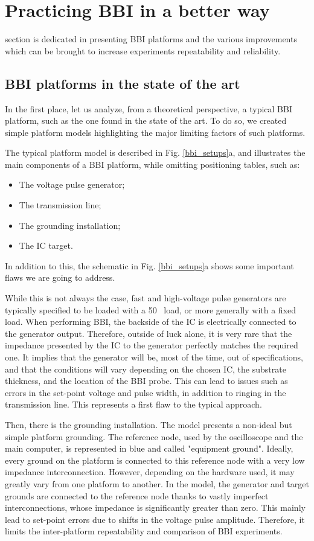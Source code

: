 
\section{Practicing BBI in a better way}
	 section is dedicated in presenting BBI platforms and the various improvements which can be brought to increase experiments repeatability and reliability.
	\subsection{BBI platforms in the state of the art}
		In the first place, let us analyze, from a theoretical perspective, a typical BBI platform, such as the one found in the state of the art.
		To do so, we created simple platform models highlighting the major limiting factors of such platforms.
		
		The typical platform model is described in Fig. \ref{bbi_setups}a, and illustrates the main components of a BBI platform, while omitting positioning tables, such as:
		\begin{itemize}
			\item The voltage pulse generator;
			\item The transmission line;
			\item The grounding installation;
			\item The IC target.
		\end{itemize}
		In addition to this, the schematic in Fig. \ref{bbi_setups}a shows some important flaws we are going to address.

		While this is not always the case, fast and high-voltage pulse generators are typically specified to be loaded with a 50 \textOmega\ load, or more generally with a fixed load.
		When performing BBI, the backside of the IC is electrically connected to the generator output.
		Therefore, outside of luck alone, it is very rare that the impedance presented by the IC to the generator perfectly matches the required one.
		It implies that the generator will be, most of the time, out of specifications, and that the conditions will vary depending on the chosen IC, the substrate thickness, and the location of the BBI probe.
		This can lead to issues such as errors in the set-point voltage and pulse width, in addition to ringing in the transmission line.
		This represents a first flaw to the typical approach.

		Then, there is the grounding installation.
		The model presents a non-ideal but simple platform grounding.
		The reference node, used by the oscilloscope and the main computer, is represented in blue and called "equipment ground".
		Ideally, every ground on the platform is connected to this reference node with a very low impedance interconnection.
		However, depending on the hardware used, it may greatly vary from one platform to another.
		In the model, the generator and target grounds are connected to the reference node thanks to vastly imperfect interconnections, whose impedance is significantly greater than zero.
		This mainly lead to set-point errors due to shifts in the voltage pulse amplitude.
		Therefore, it limits the inter-platform repeatability and comparison of BBI experiments.

